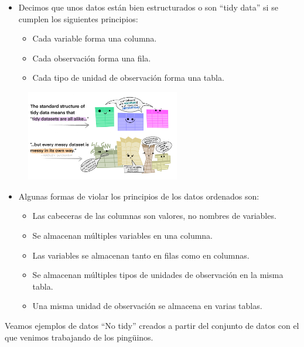 \documentclass[
  letterpaper,
  DIV=11,
  numbers=noendperiod]{scrreprt}
\begin{document}
\begin{itemize}
\item
  Decimos que unos datos están bien estructurados o son ``tidy data'' si
  se cumplen los siguientes principios:

  \begin{itemize}
  \item
    Cada variable forma una columna.
  \item
    Cada observación forma una fila.
  \item
    Cada tipo de unidad de observación forma una tabla.
  \end{itemize}
\end{itemize}

\begin{figure}

{\centering \includegraphics[width=0.6\textwidth,height=\textheight]{Figuras/tidy_data.PNG}

}

\end{figure}

\begin{itemize}
\item
  Algunas formas de violar los principios de los datos ordenados son:

  \begin{itemize}
  \item
    Las cabeceras de las columnas son valores, no nombres de variables.
  \item
    Se almacenan múltiples variables en una columna.
  \item
    Las variables se almacenan tanto en filas como en columnas.
  \item
    Se almacenan múltiples tipos de unidades de observación en la misma
    tabla.
  \item
    Una misma unidad de observación se almacena en varias tablas.
  \end{itemize}
\end{itemize}

Veamos ejemplos de datos ``No tidy'' creados a partir del conjunto de
datos con el que venimos trabajando de los pingüinos.
\end{document}

